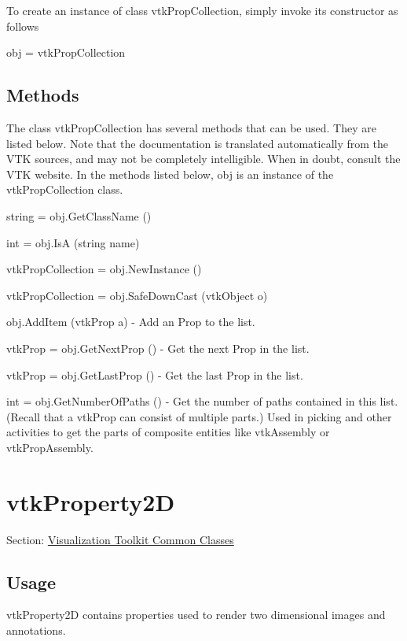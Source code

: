 To create an instance of class vtk\-Prop\-Collection, simply invoke its constructor as follows \begin{DoxyVerb}  obj = vtkPropCollection
\end{DoxyVerb}
 \hypertarget{vtkwidgets_vtkxyplotwidget_Methods}{}\subsection{Methods}\label{vtkwidgets_vtkxyplotwidget_Methods}
The class vtk\-Prop\-Collection has several methods that can be used. They are listed below. Note that the documentation is translated automatically from the V\-T\-K sources, and may not be completely intelligible. When in doubt, consult the V\-T\-K website. In the methods listed below, {\ttfamily obj} is an instance of the vtk\-Prop\-Collection class. 
\begin{DoxyItemize}
\item {\ttfamily string = obj.\-Get\-Class\-Name ()}  
\item {\ttfamily int = obj.\-Is\-A (string name)}  
\item {\ttfamily vtk\-Prop\-Collection = obj.\-New\-Instance ()}  
\item {\ttfamily vtk\-Prop\-Collection = obj.\-Safe\-Down\-Cast (vtk\-Object o)}  
\item {\ttfamily obj.\-Add\-Item (vtk\-Prop a)} -\/ Add an Prop to the list.  
\item {\ttfamily vtk\-Prop = obj.\-Get\-Next\-Prop ()} -\/ Get the next Prop in the list.  
\item {\ttfamily vtk\-Prop = obj.\-Get\-Last\-Prop ()} -\/ Get the last Prop in the list.  
\item {\ttfamily int = obj.\-Get\-Number\-Of\-Paths ()} -\/ Get the number of paths contained in this list. (Recall that a vtk\-Prop can consist of multiple parts.) Used in picking and other activities to get the parts of composite entities like vtk\-Assembly or vtk\-Prop\-Assembly.  
\end{DoxyItemize}\hypertarget{vtkcommon_vtkproperty2d}{}\section{vtk\-Property2\-D}\label{vtkcommon_vtkproperty2d}
Section\-: \hyperlink{sec_vtkcommon}{Visualization Toolkit Common Classes} \hypertarget{vtkwidgets_vtkxyplotwidget_Usage}{}\subsection{Usage}\label{vtkwidgets_vtkxyplotwidget_Usage}
vtk\-Property2\-D contains properties used to render two dimensional images and annotations.

